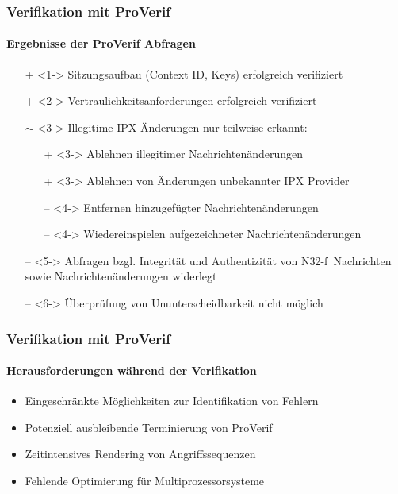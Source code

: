 \documentclass{beamer}
\begin{document}
\begin{frame}
    \frametitle{Verifikation mit ProVerif}
    \framesubtitle{Ergebnisse der ProVerif Abfragen}

    \begin{itemize}
        \item[+]<1-> Sitzungsaufbau (Context ID, Keys) erfolgreich verifiziert
        \vspace*{2mm}
        \item[+]<2-> Vertraulichkeitsanforderungen erfolgreich verifiziert
        \vspace*{2mm}
        \item[$\sim$]<3-> Illegitime IPX Änderungen nur teilweise erkannt:
        \begin{itemize}
            \item[+]<3-> Ablehnen illegitimer Nachrichtenänderungen
            \item[+]<3-> Ablehnen von Änderungen unbekannter     IPX Provider
            \item[--]<4-> Entfernen hinzugefügter Nachrichtenänderungen
            \item[--]<4-> Wiedereinspielen aufgezeichneter Nachrichtenänderungen
        \end{itemize}
        \vspace*{2mm}
        \item[--]<5-> Abfragen bzgl. Integrität und Authentizität von N32-f~Nachrichten sowie Nachrichtenänderungen widerlegt
        \vspace*{2mm}
        \item[--]<6-> Überprüfung von Ununterscheidbarkeit nicht möglich
    \end{itemize}
\end{frame}

\begin{frame}
    \frametitle{Verifikation mit ProVerif}
    \framesubtitle{Herausforderungen während der Verifikation}

    \begin{itemize}
        \item<1-> Eingeschränkte Möglichkeiten zur Identifikation von Fehlern
        \vspace*{2mm}
        \item<2-> Potenziell ausbleibende Terminierung von ProVerif
        \vspace*{2mm}
        \item<3-> Zeitintensives Rendering von Angriffssequenzen
        \vspace*{2mm}
        \item<4-> Fehlende Optimierung für Multiprozessorsysteme
    \end{itemize}
\end{frame}
\end{document}
